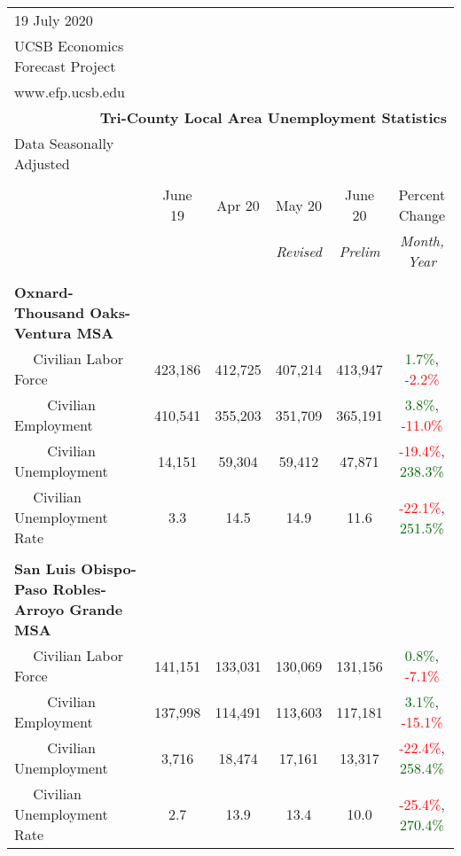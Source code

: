 \documentclass[12pt]{article}
\begin{document}
\begin{landscape}
\begin{table}
\begin{tabular}{|l|c|c|c|c|c|}
\multicolumn{1}{l}{\small 19 July 2020} & \multicolumn{5}{c}{} \\
\multicolumn{1}{l}{\small UCSB Economics Forecast Project} & \multicolumn{5}{c}{} \\
\multicolumn{1}{l}{\small www.efp.ucsb.edu} & \multicolumn{5}{c}{} \\
\multicolumn{6}{r}{\large \textbf{Tri-County Local Area Unemployment Statistics}} \\
\multicolumn{1}{l}{\small Data Seasonally Adjusted} & \multicolumn{5}{c}{} \\ \hline \hline
& & & & & \\
 & June 19 & Apr 20 & May 20 & June 20 & Percent Change \\
 & & & \small \textit{Revised} & \small \textit{Prelim} & \small \textit{Month, Year} \\ \hline
&&&&& \\
\textbf{Oxnard-Thousand Oaks-Ventura MSA} &&&&& \\
$\quad$ Civilian Labor Force &423,186 & 412,725 & 407,214 & 413,947 & \textcolor{darkgreen}{1.7\%}, \textcolor{red}{-2.2\%} \\
$\qquad$ \small Civilian Employment &410,541 & 355,203 & 351,709 & 365,191 & \textcolor{darkgreen}{3.8\%}, \textcolor{red}{-11.0\%} \\
$\qquad$ \small Civilian Unemployment &14,151 & 59,304 & 59,412 & 47,871 & \textcolor{red}{-19.4\%}, \textcolor{darkgreen}{238.3\%} \\
$\quad$ Civilian Unemployment Rate &3.3 & 14.5 & 14.9 & 11.6 & \textcolor{red}{-22.1\%}, \textcolor{darkgreen}{251.5\%} \\
&&&&& \\
\textbf{San Luis Obispo-Paso Robles-Arroyo Grande MSA} &&&&& \\
$\quad$ Civilian Labor Force &141,151 & 133,031 & 130,069 & 131,156 & \textcolor{darkgreen}{0.8\%}, \textcolor{red}{-7.1\%} \\
$\qquad$ \small Civilian Employment &137,998 & 114,491 & 113,603 & 117,181 & \textcolor{darkgreen}{3.1\%}, \textcolor{red}{-15.1\%} \\
$\qquad$ \small Civilian Unemployment &3,716 & 18,474 & 17,161 & 13,317 & \textcolor{red}{-22.4\%}, \textcolor{darkgreen}{258.4\%} \\
$\quad$ Civilian Unemployment Rate &2.7 & 13.9 & 13.4 & 10.0 & \textcolor{red}{-25.4\%}, \textcolor{darkgreen}{270.4\%} \\

\end{tabular}
\end{table}
\end{landscape}
\end{document}
